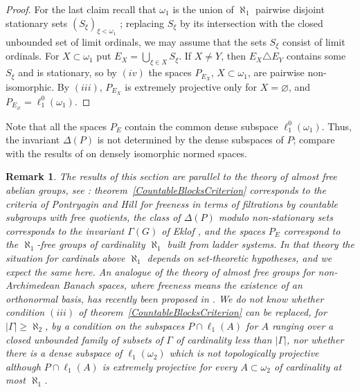 \documentclass[12pt]{article}
\newtheorem{remark}[theorem]{Remark}
\newcommand{\lo}[1]{\ell_1^0(#1)}
\newcommand{\ellone}[1]{\ell_1(#1)}
\begin{document}
\begin{proof}
    For the last claim recall that $\omega_1$ is the union of $\aleph_1$
    pairwise disjoint stationary sets ${(S_\xi)}_{\xi<\omega_1}$
    \cite[theorem 8.10]{JechSetTheory}; replacing $S_\xi$ by its intersection
    with the closed unbounded set of limit ordinals, we may assume that the
    sets $S_\xi$ consist of limit ordinals. For $X\subset\omega_1$ put
    $E_X=\bigcup_{\xi\in X}S_\xi$. If $X\neq Y$, then $E_X\triangle E_Y$
    contains some $S_\xi$ and is stationary, so by $(iv)$ the spaces
    $P_{E_X}$, $X\subset\omega_1$, are pairwise non-isomorphic. By $(iii)$,
    $P_{E_X}$ is extremely projective only for $X=\varnothing$, and
    $P_{E_\varnothing}=\lo{\omega_1}$.
\end{proof}

Note that all the spaces $P_E$ contain the common dense subspace
$\lo{\omega_1}$. Thus, the invariant $\Delta(P)$ is not determined by the
dense subspaces of $P$; compare with the results of
\cite{HajekRussoDenselyIsom} on densely isomorphic normed spaces.

\begin{remark}\label{RemarkAlmostFree} The results of this section are parallel to the theory of
    almost free abelian groups, see \cite{EklofMeklerAlmostFree}:
    theorem~\ref{CountableBlocksCriterion} corresponds to the criteria of
    Pontryagin and Hill \cite{HillFreeness} for freeness in terms of
    filtrations by countable
    subgroups with free quotients, the class of $\Delta(P)$ modulo
    non-stationary sets corresponds to the invariant $\Gamma(G)$ of
    Eklof \cite{EklofKappaFree},
    and the spaces $P_E$ correspond to the $\aleph_1$-free groups of
    cardinality $\aleph_1$ built from ladder systems. In that theory the
    situation for cardinals above $\aleph_1$ depends on set-theoretic
    hypotheses, and we expect the same here. An analogue of the theory of
    almost free groups for non-Archimedean Banach spaces, where freeness
    means the existence of an orthonormal basis, has recently been
    proposed in \cite{MiharaAlmostFree}. We do not know whether
    condition $(iii)$ of theorem~\ref{CountableBlocksCriterion} can be
    replaced, for $|\Gamma|\geq\aleph_2$, by a condition on the subspaces
    $P\cap\ellone{A}$ for $A$ ranging over a closed unbounded family of
    subsets of $\Gamma$ of cardinality less than $|\Gamma|$, nor whether
    there is a dense subspace of $\ellone{\omega_2}$ which is not
    topologically projective although $P\cap\ellone{A}$ is extremely
    projective for every $A\subset\omega_2$ of cardinality at most $\aleph_1$.
\end{remark}
\end{document}

